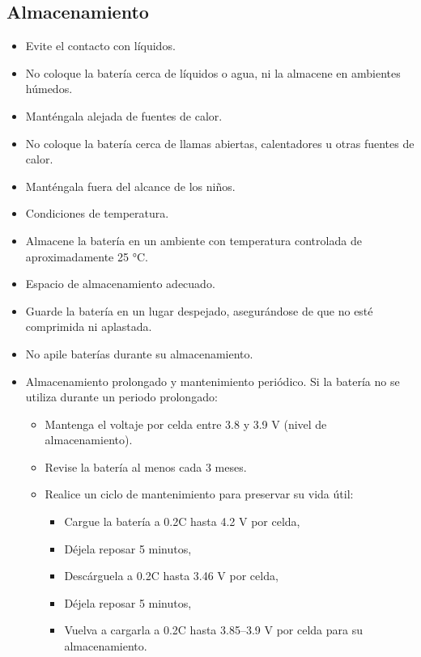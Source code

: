 \documentclass[a4paper,12pt,oneside,pdflatex,italian,final,twocolumn]{article}
\begin{document}
\subsection{Almacenamiento}
\begin{itemize} 
    \item Evite el contacto con líquidos.
    \item No coloque la batería cerca de líquidos o agua, ni la almacene en ambientes húmedos.
    \item Manténgala alejada de fuentes de calor.
    \item No coloque la batería cerca de llamas abiertas, calentadores u otras fuentes de calor.
    \item Manténgala fuera del alcance de los niños.
    \item Condiciones de temperatura.
    \item Almacene la batería en un ambiente con temperatura controlada de aproximadamente 25 °C.
    \item Espacio de almacenamiento adecuado.
    \item Guarde la batería en un lugar despejado, asegurándose de que no esté comprimida ni aplastada.
    \item No apile baterías durante su almacenamiento.  
    \item Almacenamiento prolongado y mantenimiento periódico. Si la batería no se utiliza durante un periodo prolongado:
    \begin{itemize}
        \item Mantenga el voltaje por celda entre 3.8 y 3.9 V (nivel de almacenamiento).
        \item Revise la batería al menos cada 3 meses.
        \item Realice un ciclo de mantenimiento para preservar su vida útil:
        \begin{itemize}
            \item Cargue la batería a 0.2C hasta 4.2 V por celda,
            \item Déjela reposar 5 minutos,
            \item Descárguela a 0.2C hasta 3.46 V por celda,
            \item Déjela reposar 5 minutos,
            \item Vuelva a cargarla a 0.2C hasta 3.85–3.9 V por celda para su almacenamiento.
        \end{itemize}
    \end{itemize}
\end{itemize}
\end{document}
